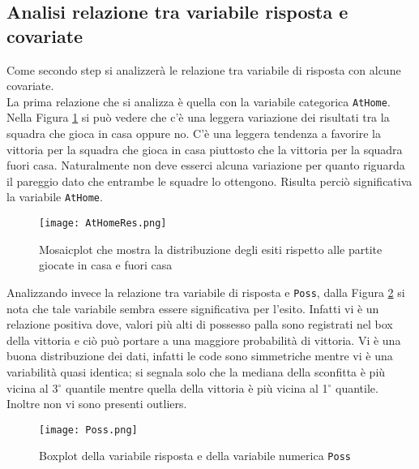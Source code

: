 \subsection{Analisi relazione tra variabile risposta e covariate}
Come secondo step si analizzerà le relazione tra variabile di risposta con alcune covariate.\\

La prima relazione che si analizza è quella con la variabile categorica \texttt{AtHome}. Nella Figura \ref{fig:AtHome} si può vedere che c'è una leggera variazione dei risultati tra la squadra che gioca in casa oppure no. C'è una leggera tendenza a favorire la vittoria per la squadra che gioca in casa piuttosto che la vittoria per la squadra fuori casa. Naturalmente non deve esserci alcuna variazione per quanto riguarda il pareggio dato che entrambe le squadre lo ottengono. Risulta perciò significativa la variabile \texttt{AtHome}.\\

\begin{figure}[htbp]
	\begin{center}
		\texttt{[image: AtHomeRes.png]}
		\caption{Mosaicplot che mostra la distribuzione degli esiti rispetto alle partite giocate in casa e fuori casa} \label{fig:AtHome}
	\end{center}
\end{figure}

Analizzando invece la relazione tra variabile di risposta e \texttt{Poss}, dalla Figura \ref{fig:Poss} si nota che tale variabile sembra essere significativa per l'esito. Infatti vi è un relazione positiva dove, valori più alti di possesso palla sono registrati nel box della vittoria e ciò può portare a una maggiore probabilità di vittoria. Vi è una buona distribuzione dei dati, infatti le code sono simmetriche mentre vi è una variabilità quasi identica; si segnala solo che la mediana della sconfitta è più vicina al 3$^{\circ}$ quantile mentre quella della vittoria è più vicina al 1$^{\circ}$ quantile. Inoltre non vi sono presenti outliers.\\

\begin{figure}[htbp]
	\begin{center}
		\texttt{[image: Poss.png]}
		\caption{Boxplot della variabile risposta e della variabile numerica \texttt{Poss} } \label{fig:Poss}
	\end{center}
\end{figure}

